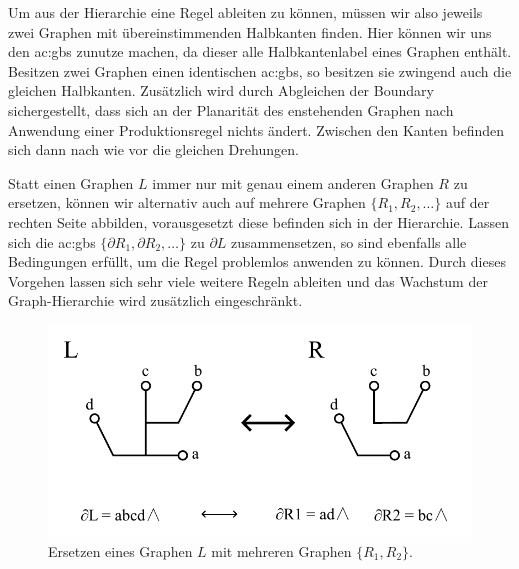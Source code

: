 Um aus der Hierarchie eine Regel ableiten zu können, müssen wir also jeweils zwei Graphen mit übereinstimmenden Halbkanten finden. Hier können wir uns
den \gls{ac:gbs} zunutze machen, da dieser alle Halbkantenlabel eines Graphen enthält. Besitzen zwei Graphen einen identischen \gls{ac:gbs}, so besitzen
sie zwingend auch die gleichen Halbkanten. Zusätzlich wird durch Abgleichen der Boundary sichergestellt, dass sich an der Planarität des enstehenden
Graphen nach Anwendung einer Produktionsregel nichts ändert. Zwischen den Kanten befinden sich dann nach wie vor die gleichen Drehungen.

Statt einen Graphen \(L\) immer nur mit genau einem anderen Graphen \(R\) zu ersetzen, können wir alternativ auch auf mehrere Graphen \(\{R_1, R_2, \dots\}\)
auf der rechten Seite abbilden, vorausgesetzt diese befinden sich in der Hierarchie. Lassen sich die \gls{ac:gbs} \(\{\partial R_1, \partial R_2, \dots\}\)
zu \(\partial L\) zusammensetzen, so sind ebenfalls alle Bedingungen erfüllt, um die Regel problemlos anwenden zu können. Durch dieses Vorgehen lassen sich
sehr viele weitere Regeln ableiten und das Wachstum der Graph-Hierarchie wird zusätzlich eingeschränkt.

\begin{figure}[t]
    \centering
    \includegraphics[width=(\imgWidth*3/4)]{images/set_of_graphs.pdf}
    \caption{Ersetzen eines Graphen \(L\) mit mehreren Graphen \(\{R_1,R_2\}\).}
    \label{fig:set_of_graphs}
\end{figure}

